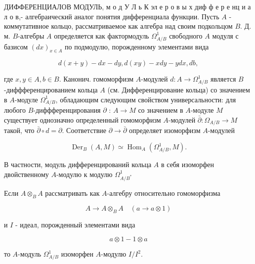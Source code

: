 \documentclass[10pt]{article}
\begin{document}
ДИФФЕРЕНЦИАЛОВ МОДУЛЬ, м о д У Л ь К эл е р о в ы х диф ф е р е нц и а л о в,- алгебраический аналог понятия дифференциала функции. Пусть $A$ - коммутативное кольцо, рассматриваемое как алгебра над своим подкольцом $B$. Д. м. $B$-алгебры $A$ определяется как фактормодуль $\Omega_{A / B}^{1}$ свободного $A$ модуля с базисом $(d x)_{x \in A}$ по подмодулю, порожденному элементами вида



\[

d(x+y)-d x-d y, d(x y)-x d y-y d x, d b,

\]



где $x, y \in A, b \in B$. Канонич. гомоморфизм $A$-модулей $d: A \rightarrow \Omega_{A / B}^{1}$ является $B$-диффференцированием кольца $A$ (см. Дифференцирование кольца) со значением в $A$-модуле $\Omega_{A / B}^{1}$, обладающим следующим свойством универсальности: для любого $B$-диффференцирования $\partial$ : $A \rightarrow M$ со значением в $A$-модуле $M$ существует однозначно определенный гомоморфизм $A$-модулей $\bar{\partial}: \Omega_{A / B} \rightarrow M$ такой, что $\bar{\partial} \circ d=\partial$. Соответствие $\partial \rightarrow \bar{\partial}$ определяет изоморфизм $A$-модулей



\[

\operatorname{Der}_{B}(A, M) \simeq \operatorname{Hom}_{A}\left(\Omega_{A / B}^{1}, M\right) .

\]



В частности, модуль дифференцирований кольца $A$ в себя изоморфен двойственному $A$-модулю к модулю $\Omega_{A / B^{*}}^{1}$



Если $A \otimes_{B} A$ рассматривать как $A$-алгебру относительно гомоморфизма



\[

A \longrightarrow A \otimes_{B} A \quad(a \longrightarrow a \otimes 1)

\]



и $I$ - идеал, порожденный элементами вида



\[

a \otimes 1-1 \otimes a

\]



то $A$-модуль $\Omega_{A / B}^{1}$ изоморфен $A$-модулю $I / I^{2}$.
\end{document}
